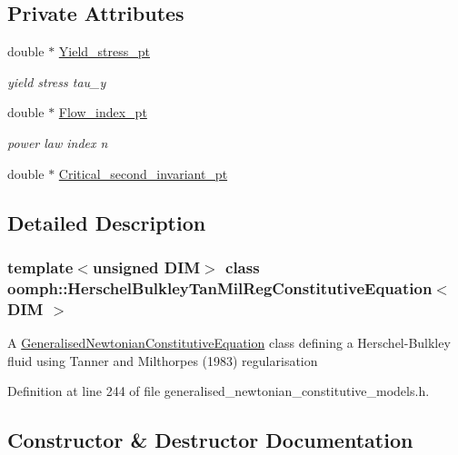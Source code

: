 \subsection*{Private Attributes}
\begin{DoxyCompactItemize}
\item 
double $\ast$ \hyperlink{classoomph_1_1HerschelBulkleyTanMilRegConstitutiveEquation_ab82870d38f24c2fa57bda8b0e2757e88}{Yield\+\_\+stress\+\_\+pt}
\begin{DoxyCompactList}\small\item\em yield stress tau\+\_\+y \end{DoxyCompactList}\item 
double $\ast$ \hyperlink{classoomph_1_1HerschelBulkleyTanMilRegConstitutiveEquation_adb6717490ace6db7300c049c1df2c8fa}{Flow\+\_\+index\+\_\+pt}
\begin{DoxyCompactList}\small\item\em power law index n \end{DoxyCompactList}\item 
double $\ast$ \hyperlink{classoomph_1_1HerschelBulkleyTanMilRegConstitutiveEquation_ad77e04bccbd2e7eb24fc8965e68007b9}{Critical\+\_\+second\+\_\+invariant\+\_\+pt}
\end{DoxyCompactItemize}


\subsection{Detailed Description}
\subsubsection*{template$<$unsigned D\+IM$>$\newline
class oomph\+::\+Herschel\+Bulkley\+Tan\+Mil\+Reg\+Constitutive\+Equation$<$ D\+I\+M $>$}

A \hyperlink{classoomph_1_1GeneralisedNewtonianConstitutiveEquation}{Generalised\+Newtonian\+Constitutive\+Equation} class defining a Herschel-\/\+Bulkley fluid using Tanner and Milthorpe\textquotesingle{}s (1983) regularisation 

Definition at line 244 of file generalised\+\_\+newtonian\+\_\+constitutive\+\_\+models.\+h.



\subsection{Constructor \& Destructor Documentation}
\mbox{\label{classoomph_1_1HerschelBulkleyTanMilRegConstitutiveEquation_a9d29fd9b5b414a0bb8bebd521ea48ea0}} 

